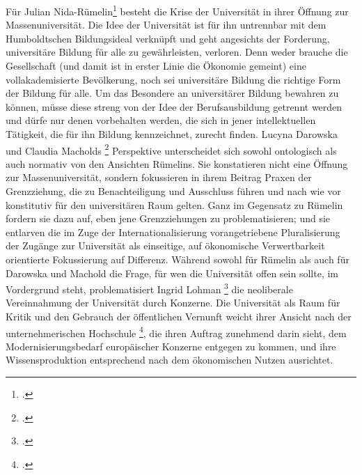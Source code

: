   Für Julian Nida-Rümelin\footnotemark \footcitetext{nida} besteht die Krise
  der Universität in ihrer Öffnung zur Massenuniversität. Die Idee der
  Universität ist für ihn untrennbar mit dem \glqq Humboldtschen Bildungsideal
  \grqq \footnotemark {} verknüpft und geht angesichts der
Forderung, universitäre Bildung für alle zu gewährleisten, verloren. Denn weder
brauche die Gesellschaft (und damit ist in erster Linie die Ökonomie gemeint)
eine vollakademisierte Bevölkerung, noch sei universitäre Bildung die richtige
Form der Bildung für alle. Um das Besondere an universitärer Bildung bewahren
zu können, müsse diese streng von der Idee der Berufsausbildung getrennt werden
und dürfe nur denen vorbehalten werden, die sich in jener intellektuellen
Tätigkeit, die für ihn Bildung kennzeichnet, zurecht finden. Lucyna Darowska
und Claudia Macholds \footnotemark \footcitetext{lucyna} Perspektive unterscheidet sich sowohl ontologisch als
auch normativ von den Ansichten Rümelins. Sie konstatieren nicht eine Öffnung
zur Massenuniversität, sondern fokussieren in ihrem Beitrag Praxen der
Grenzziehung, die zu Benachteiligung und Ausschluss führen und nach wie vor
konstitutiv für den universitären Raum gelten. Ganz im Gegensatz zu Rümelin
fordern sie dazu auf, eben jene Grenzziehungen zu problematisieren; und sie
entlarven die im Zuge der Internationalisierung vorangetriebene Pluralisierung
der Zugänge zur Universität als einseitige, auf ökonomische Verwertbarkeit
orientierte Fokussierung auf Differenz.  Während sowohl für Rümelin als auch
für Darowska und Machold die Frage, für wen die Universität offen sein sollte,
im Vordergrund steht, problematisiert Ingrid Lohman \footnotemark
\footcitetext{lohman} die neoliberale
Vereinnahmung der Universität durch Konzerne. Die Universität als Raum für
Kritik und den Gebrauch der öffentlichen Vernunft weicht ihrer Ansicht nach der
\glqq unternehmerischen Hochschule \grqq \footnotemark \footcitetext{lohmein}, die ihren Auftrag zunehmend darin sieht, dem
Modernisierungsbedarf europäischer Konzerne entgegen zu kommen, und ihre
Wissensproduktion entsprechend nach dem ökonomischen Nutzen ausrichtet. 

